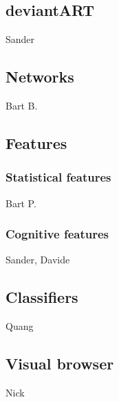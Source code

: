 \subsection{deviantART}
Sander

\subsection{Networks}
Bart B.

\subsection{Features}

\subsubsection{Statistical features}
Bart P.

\subsubsection{Cognitive features}
Sander, Davide

\subsection{Classifiers}
Quang

\subsection{Visual browser}
Nick
